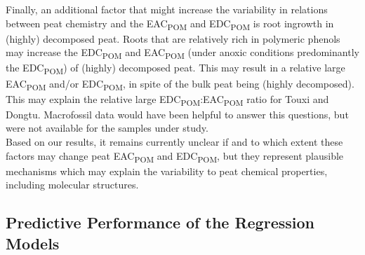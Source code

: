 \documentclass[draft,linenumbers]{agujournal2018}
\begin{document}
Finally, an additional factor that might increase the variability in
relations between peat chemistry and the EAC\textsubscript{POM} and
EDC\textsubscript{POM} is root ingrowth in (highly) decomposed peat.
Roots that are relatively rich in polymeric phenols
\citep{Moore.2007, Scheffer.2000} may increase the
EDC\textsubscript{POM} and EAC\textsubscript{POM} (under anoxic
conditions predominantly the EDC\textsubscript{POM}) of (highly)
decomposed peat. This may result in a relative large
EAC\textsubscript{POM} and/or EDC\textsubscript{POM}, in spite of the
bulk peat being (highly decomposed). This may explain the relative large
EDC\textsubscript{POM}:EAC\textsubscript{POM} ratio for Touxi and
Dongtu. Macrofossil data would have been helpful to answer this
questions, but were not available for the samples under study.\\
Based on our results, it remains currently unclear if and to which
extent these factors may change peat EAC\textsubscript{POM} and
EDC\textsubscript{POM}, but they represent plausible mechanisms which
may explain the variability to peat chemical properties, including
molecular structures.

\subsection{Predictive Performance of the Regression Models}
\end{document}
